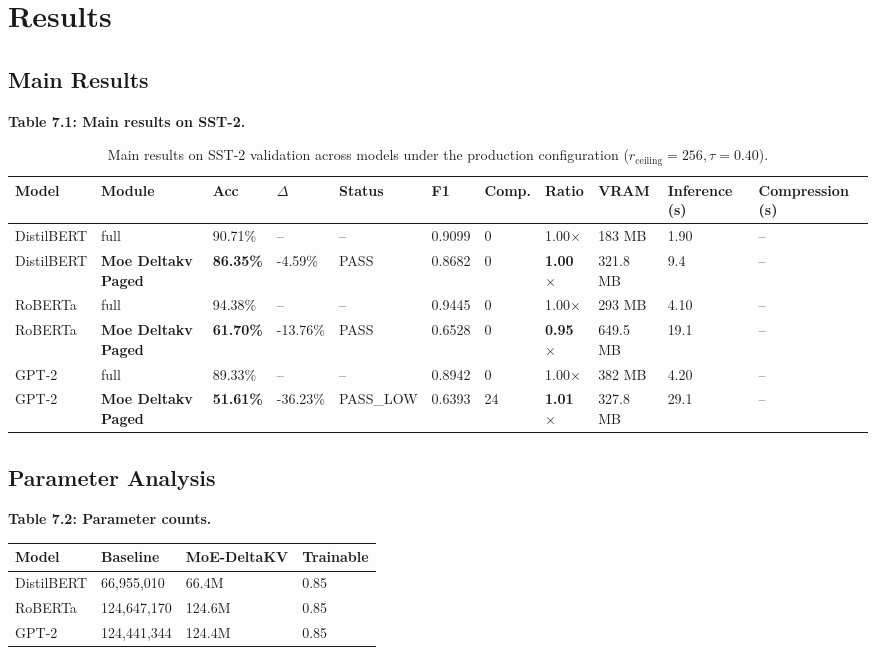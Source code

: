 \section{Results}

\subsection{Main Results}

\textbf{Table 7.1: Main results on SST-2.}

\begin{table}[t]
\centering
\small
\begin{tabular}{lllllllllll}
\toprule
\textbf{Model} & \textbf{Module} & \textbf{Acc} & \textbf{$\Delta$} & \textbf{Status} & \textbf{F1} & \textbf{Comp.} & \textbf{Ratio} & \textbf{VRAM} & \textbf{Inference (s)} & \textbf{Compression (s)} \\
\midrule
DistilBERT & full & 90.71\% & -- & -- & 0.9099 & 0 & 1.00$\times$ & 183 MB & 1.90 & -- \\
DistilBERT & \textbf{Moe Deltakv Paged} & \textbf{86.35\%} & -4.59\% & PASS & 0.8682 & 0 & \textbf{1.00$\times$} & 321.8 MB & 9.4 & -- \\
RoBERTa & full & 94.38\% & -- & -- & 0.9445 & 0 & 1.00$\times$ & 293 MB & 4.10 & -- \\
RoBERTa & \textbf{Moe Deltakv Paged} & \textbf{61.70\%} & -13.76\% & PASS & 0.6528 & 0 & \textbf{0.95$\times$} & 649.5 MB & 19.1 & -- \\
GPT-2 & full & 89.33\% & -- & -- & 0.8942 & 0 & 1.00$\times$ & 382 MB & 4.20 & -- \\
GPT-2 & \textbf{Moe Deltakv Paged} & \textbf{51.61\%} & -36.23\% & PASS_LOW & 0.6393 & 24 & \textbf{1.01$\times$} & 327.8 MB & 29.1 & -- \\
\bottomrule
\end{tabular}
\caption{Main results on SST-2 validation across models under the production configuration ($r_{\mathrm{ceiling}}=256, \tau=0.40$).}
\label{tab:main_sst2}
\end{table}

\subsection{Parameter Analysis}

\textbf{Table 7.2: Parameter counts.}

\begin{table}[H]
\centering
\small
\begin{tabular}{llll}
\toprule
\textbf{Model} & \textbf{Baseline} & \textbf{MoE-DeltaKV} & \textbf{Trainable} \\
\midrule
DistilBERT & 66,955,010 & 66.4M & 0.85 \\
RoBERTa & 124,647,170 & 124.6M & 0.85 \\
GPT-2 & 124,441,344 & 124.4M & 0.85 \\
\bottomrule
\end{tabular}
\end{table}


